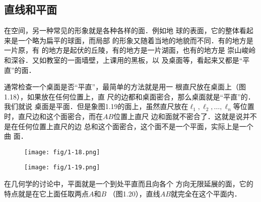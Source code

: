 \subsection{直线和平面}
在空间，另一种常见的形象就是各种各样的面．例如地
球的表面，它的整体看起来是一个略为扁平的球面，而局部
的形象又随着当地的地貌而不同．有的地方是一片原，有
的地方是起伏的丘陵，有的地方是一片湖面，也有的地方是
崇山峻岭和深谷．又如教室的一面墙壁，上课用的黑板，以
及桌面等，看起来又都是“平直”的面．

通常检查一个桌面是否“平直”，最简单的方法就是用一
根直尺放在桌面上（图1.18），如果放在任何位置上，直
尺的边都和桌面密合，那么桌面就是“平直”的．我们就说
桌面是平面．但是象图1.19的面上，虽然直尺放在$\ell_1,\ell_2,\ldots,\ell_n$等位置时，直尺边和这个面密合，而在$AB$位置上直尺
边和面就不密合了．这就是说并不是在任何位置上直尺的边
总和这个面密合，这个面不是一个平面，实际上是一个曲
面．
\begin{figure}[htp]\centering
    \begin{minipage}[t]{0.48\textwidth}
    \centering
	\texttt{[image: fig/1-18.png]}
    \caption{}
    \end{minipage}
    \begin{minipage}[t]{0.48\textwidth}
    \centering
	\texttt{[image: fig/1-19.png]}
    \caption{}
    \end{minipage}
    \end{figure}

在几何学的讨论中，平面就是一个到处平直而且向各个
方向无限延展的面，它的特点就是在它上面任取两点$A$和$B$
（图1.20），直线$AB$就完全在这个平面内．

\begin{figure}[htp]\centering
    \begin{minipage}[t]{0.48\textwidth}
    \centering
{}
    \caption{}
    \end{minipage}
    \begin{minipage}[t]{0.48\textwidth}
    \centering
    \caption{}
    \end{minipage}
    \end{figure}

